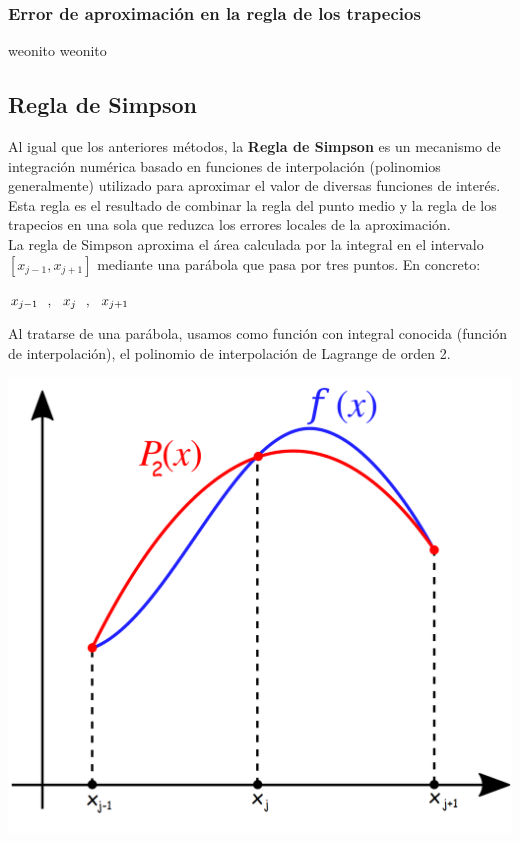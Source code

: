\documentclass{article}
\begin{document}
	\subsubsection{Error de aproximación en la regla de los trapecios}
	
	weonito weonito

	\subsection{Regla de Simpson}
	
	Al igual que los anteriores métodos, la \textbf{Regla de Simpson} es un mecanismo de integración numérica basado en funciones de interpolación (polinomios generalmente) utilizado para aproximar el valor de diversas funciones de interés. Esta regla es el resultado de combinar la regla del punto medio y la regla de los trapecios en una sola que reduzca los errores locales de la aproximación.\\
	
	La regla de Simpson aproxima el área calculada por la integral en el intervalo $[x_{j-1} , x_{j+1}]$ mediante una parábola que pasa por tres puntos. En concreto:
	
	\begin{center}
		$x_{j-1} \hspace{2.5mm},\hspace{2.5mm} x_{j} \hspace{2.5mm},\hspace{2.5mm} x_{j+1}$
	\end{center}
	
	Al tratarse de una parábola, usamos como función con integral conocida (función de interpolación), el polinomio de interpolación de Lagrange de orden 2.\\
	
	\begin{center}
		\includegraphics[scale=0.26]{intro}
	\end{center}
	
\end{document}
